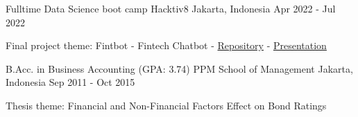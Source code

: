 

\begin{cventries}

  \cventry
    {Fulltime Data Science boot camp} %
    {Hacktiv8} %
    {Jakarta, Indonesia} %
    {Apr 2022 - Jul 2022} %
    {
      \begin{cvitems} %
        \item {Final project theme: Fintbot - Fintech Chatbot - \href{https://github.com/H8-Assignments-Bay/p2---final-project-group-003}{Repository} - \href{https://www.youtube.com/watch?v=3QJtzI4h6No}{Presentation}}
      \end{cvitems}
    }

  \cventry
    {B.Acc. in Business Accounting (GPA: 3.74)} %
    {PPM School of Management} %
    {Jakarta, Indonesia} %
    {Sep 2011 - Oct 2015} %
    {
      \begin{cvitems} %
        \item {Thesis theme: Financial and Non-Financial Factors Effect on Bond Ratings}
      \end{cvitems}
    }

\end{cventries}

